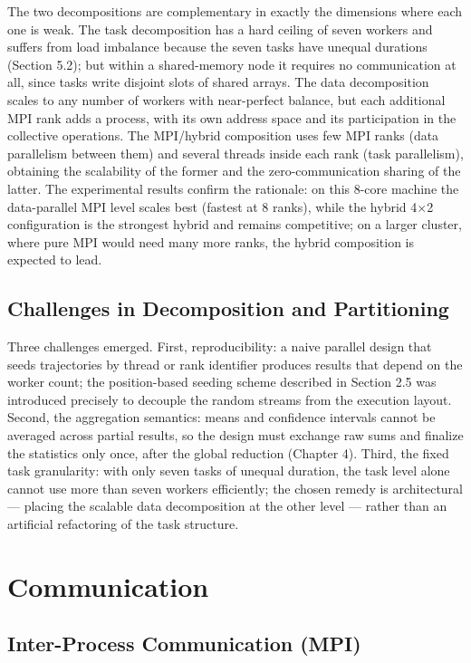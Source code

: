 \documentclass[12pt,a4paper]{article}
\begin{document}
The two decompositions are complementary in exactly the dimensions where
each one is weak. The task decomposition has a hard ceiling of seven
workers and suffers from load imbalance because the seven tasks have
unequal durations (Section 5.2); but within a shared-memory node it
requires no communication at all, since tasks write disjoint slots of
shared arrays. The data decomposition scales to any number of workers
with near-perfect balance, but each additional MPI rank adds a process,
with its own address space and its participation in the collective
operations. The MPI/hybrid composition uses few MPI ranks (data
parallelism between them) and several threads inside each rank (task
parallelism), obtaining the scalability of the former and the
zero-communication sharing of the latter. The experimental results
confirm the rationale: on this 8-core machine the data-parallel MPI
level scales best (fastest at 8 ranks), while the hybrid 4$\times$2
configuration is the strongest hybrid and remains competitive; on a
larger cluster, where pure MPI would need many more ranks, the hybrid
composition is expected to lead.

\subsection{Challenges in Decomposition and Partitioning}

Three challenges emerged. First, reproducibility: a naive parallel
design that seeds trajectories by thread or rank identifier produces
results that depend on the worker count; the position-based seeding
scheme described in Section 2.5 was introduced precisely to decouple the
random streams from the execution layout. Second, the aggregation
semantics: means and confidence intervals cannot be averaged across
partial results, so the design must exchange raw sums and finalize the
statistics only once, after the global reduction (Chapter 4). Third, the
fixed task granularity: with only seven tasks of unequal duration, the
task level alone cannot use more than seven workers efficiently; the
chosen remedy is architectural --- placing the scalable data
decomposition at the other level --- rather than an artificial
refactoring of the task structure.

\section{Communication}

\subsection{Inter-Process Communication (MPI)}
\end{document}
